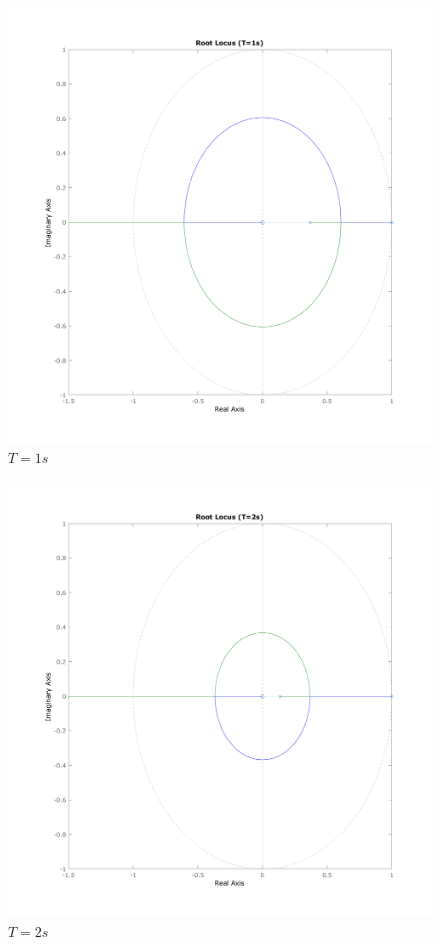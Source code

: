 \documentclass[a4paper,11pt]{article}
\begin{document}
\begin{figure}[H]
    \centering
    \includegraphics[width=0.9\linewidth]{img/exsim3-rlocus-t1000ms.png}
    \caption{ $T=1s$}
\end{figure}

\begin{figure}[H]
    \centering
    \includegraphics[width=0.9\linewidth]{img/exsim3-rlocus-t2000ms.png}
    \caption{ $T=2s$}
\end{figure}
\end{document}
